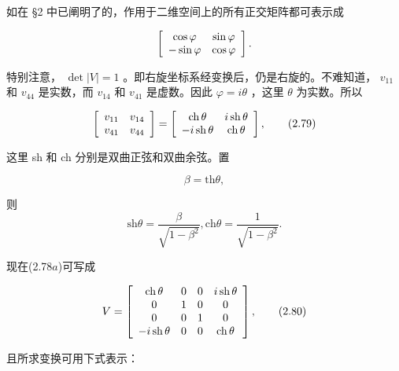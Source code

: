 如在 §2 中已阐明了的，作用于二维空间上的所有正交矩阵都可表示成

\begin{equation*}
\left[ \begin{array}{c c} \cos \varphi & \sin \varphi \\ - \sin \varphi & \cos \varphi \end{array} \right].
\end{equation*}

特别注意， $\operatorname{det}|V| = 1$ 。即右旋坐标系经变换后，仍是右旋的。不难知道， $v_{11}$ 和 $v_{44}$ 是实数，而 $v_{14}$ 和 $v_{41}$ 是虚数。因此 $\varphi = i\theta$ ，这里 $\theta$ 为实数。所以

\begin{equation*}
\left[ \begin{array}{l l} v _ {1 1} & v _ {1 4} \\ v _ {4 1} & v _ {4 4} \end{array} \right] = \left[ \begin{array}{c c} \operatorname{ch} \theta & i \operatorname{sh} \theta \\ - i \operatorname{sh} \theta & \operatorname{ch} \theta \end{array} \right],\tag{2.79}
\end{equation*}

这里 sh 和 ch 分别是双曲正弦和双曲余弦。置

\begin{equation*}
\beta = \mathrm{th} \theta ,
\end{equation*}

则
\begin{equation*}
\mathrm{sh} \theta = \frac {\beta}{\sqrt {1 - \beta^ {2}}}, \mathrm{ch} \theta = \frac {1}{\sqrt {1 - \beta^ {2}}}.
\end{equation*}

现在(2.78$a$)可写成

\begin{equation*}
V = \left[ \begin{array}{c c c c} \operatorname{ch} \theta & 0 & 0 & i \operatorname{sh} \theta \\ 0 & 1 & 0 & 0 \\ 0 & 0 & 1 & 0 \\ - i \operatorname{sh} \theta & 0 & 0 & \operatorname{ch} \theta \end{array} \right],\tag{2.80}
\end{equation*}

且所求变换可用下式表示：

